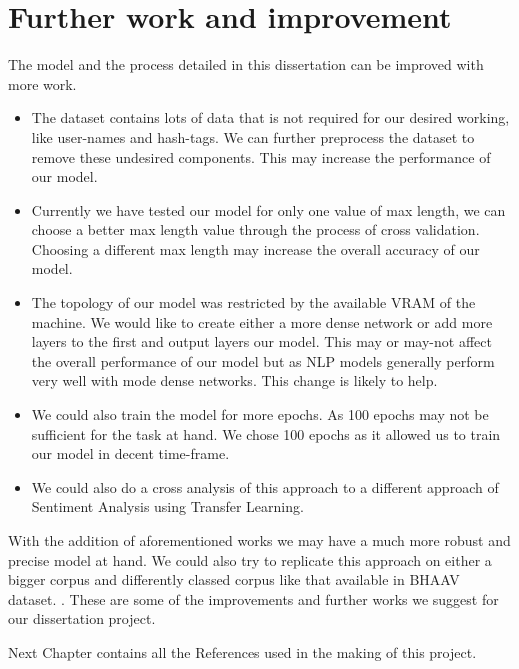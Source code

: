 \documentclass[a4paper, 12pt]{article}
\begin{document}
\begin{sloppypar}
  \section{Further work and improvement}
  The model and the process detailed in this dissertation can be improved with more work. 
  \begin{itemize}
  \item The dataset contains lots of data that is not required for our desired working, like user-names and hash-tags. We can further preprocess the dataset to remove these undesired components. This may increase the performance of our model.
  
  \item Currently we have tested our model for only one value of max length, we can choose a better max length value through the process of cross validation. Choosing a different max length may increase the overall accuracy of our model.
  
  \item The topology of our model was restricted by the available VRAM of the machine. We would like to create either a more dense network or add more layers to the first and output layers our model. This may or may-not affect the overall performance of our model but as NLP models generally perform very well with mode dense networks. This change is likely to help.
  
  \item We could also train the model for more epochs. As 100 epochs may not be sufficient for the task at hand. We chose 100 epochs as it allowed us to train our model in decent time-frame.
  
  \item We could also do a cross analysis of this approach to a different approach of Sentiment Analysis using Transfer Learning.
  \end{itemize}   
  With the addition of aforementioned works we may have a much more robust and precise model at hand. We could also try to replicate this approach on either a bigger corpus and differently classed corpus like that available in BHAAV dataset. \cite{kumar_bhaav_2019}. These are some of the improvements and further works we suggest for our dissertation project.
  
  Next Chapter contains all the References used in the making of this project.

\clearpage
\printbibliography[heading=bibintoc]
\clearpage

\end{sloppypar}
\end{document}
